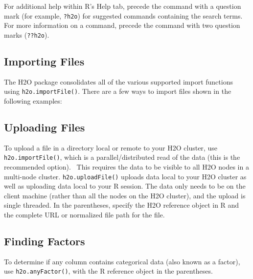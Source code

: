 {{For additional help within R's Help tab, precede the command with a question mark (for example, {\texttt{?h2o}}) for suggested commands containing the search terms. For more information on a command, precede the command with two question marks ({\texttt{??h2o}}).

\subsection{Importing Files}

The H2O package consolidates all of the various supported import functions using {\texttt{h2o.importFile()}}. %
There are a few ways to import files shown in the following examples:

\waterExampleInR
\medskip


\subsection{Uploading Files}

To upload a file in a directory local or remote to your H2O cluster, use {\texttt{h2o.importFile()}}, which is a parallel/distributed read of the data (this is the recommended option).  This requires the data to be visible to all H2O nodes in a multi-node cluster. {\texttt{h2o.uploadFile()}} uploads data local to your H2O cluster as well as uploading data local to your R session. The data only needs to be on the client machine (rather than all the nodes on the H2O cluster), and the upload is single threaded. In the parentheses, specify the H2O reference object in R and the complete URL or normalized file path for the file.


\waterExampleInR
\medskip



\subsection{Finding Factors}
To determine if any column contains categorical data (also known as a factor), use {\texttt{h2o.anyFactor()}}, with the R reference object in the parentheses.

\waterExampleInR
\medskip


}}
